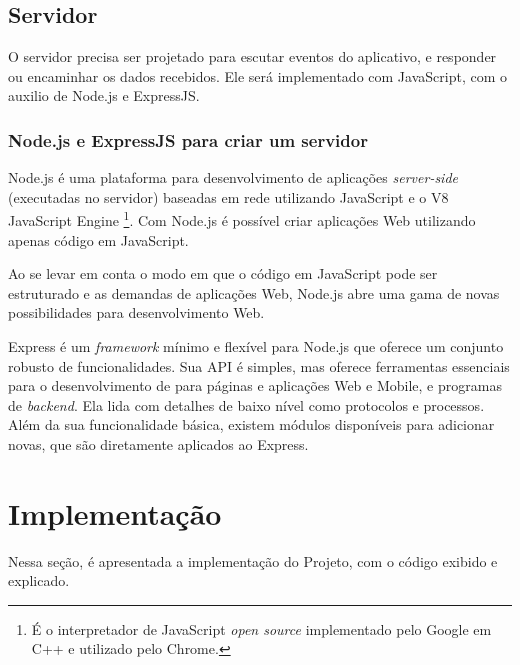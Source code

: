 \documentclass[a4paper,12pt]{article}
\begin{document}
\subsection{Servidor}

O servidor precisa ser projetado para escutar eventos do aplicativo, e responder ou encaminhar os dados recebidos. Ele será implementado com JavaScript, com o auxilio de Node.js e ExpressJS.

\subsubsection{Node.js e ExpressJS para criar um servidor}

Node.js é uma plataforma para desenvolvimento de aplicações \emph{server-side} (executadas no servidor) baseadas em rede utilizando JavaScript e o V8 JavaScript Engine \footnote{É o interpretador de JavaScript \emph{open source} implementado pelo Google em C++ e utilizado pelo Chrome.}. Com Node.js é possível criar aplicações Web utilizando apenas código em JavaScript.

Ao se levar em conta o modo em que o código em JavaScript pode ser estruturado e as demandas de aplicações Web, Node.js abre uma gama de novas possibilidades para desenvolvimento Web.

Express é um \emph{framework} mínimo e flexível para Node.js que oferece um conjunto robusto de funcionalidades. Sua API é simples, mas oferece ferramentas essenciais para o desenvolvimento de para páginas e aplicações Web e Mobile, e programas de \emph{backend}. Ela lida com detalhes de baixo nível como protocolos e processos. Além da sua funcionalidade básica, existem módulos disponíveis para adicionar novas, que são diretamente aplicados ao Express.
























\newpage
\section{Implementação}

Nessa seção, é apresentada a implementação do Projeto, com o código exibido e explicado.
\end{document}
